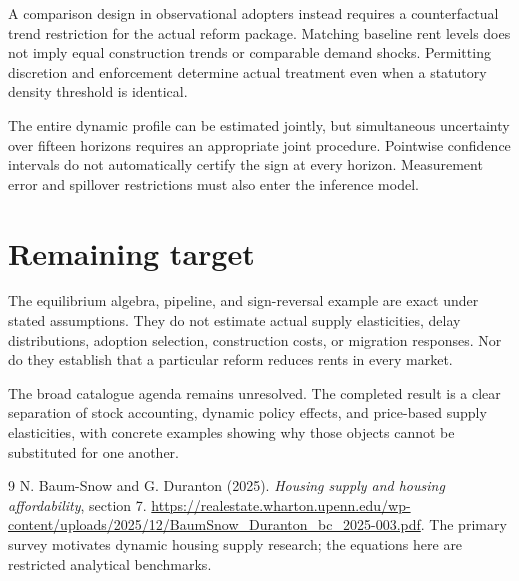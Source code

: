 \documentclass[11pt,a4paper]{article}
\begin{document}
A comparison design in observational adopters instead requires a counterfactual trend restriction for the actual reform package. Matching baseline rent levels does not imply equal construction trends or comparable demand shocks. Permitting discretion and enforcement determine actual treatment even when a statutory density threshold is identical.

The entire dynamic profile can be estimated jointly, but simultaneous uncertainty over fifteen horizons requires an appropriate joint procedure. Pointwise confidence intervals do not automatically certify the sign at every horizon. Measurement error and spillover restrictions must also enter the inference model.
\section{Remaining target}
The equilibrium algebra, pipeline, and sign-reversal example are exact under stated assumptions. They do not estimate actual supply elasticities, delay distributions, adoption selection, construction costs, or migration responses. Nor do they establish that a particular reform reduces rents in every market.

The broad catalogue agenda remains unresolved. The completed result is a clear separation of stock accounting, dynamic policy effects, and price-based supply elasticities, with concrete examples showing why those objects cannot be substituted for one another.
\begin{thebibliography}{9}
 N. Baum-Snow and G. Duranton (2025).
\emph{Housing supply and housing affordability}, section 7.
\url{https://realestate.wharton.upenn.edu/wp-content/uploads/2025/12/BaumSnow_Duranton_bc_2025-003.pdf}.
The primary survey motivates dynamic housing supply research; the equations here are restricted analytical benchmarks.
\end{thebibliography}
\end{document}
